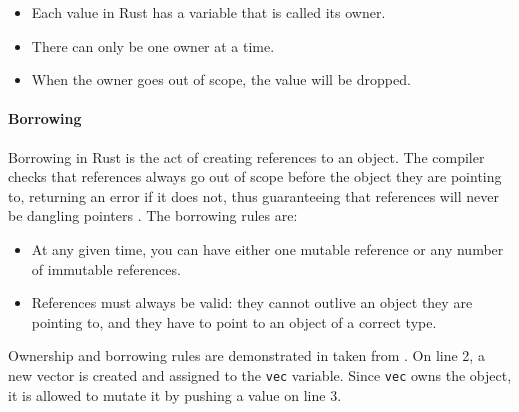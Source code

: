 \begin{itemize}
    \item Each value in Rust has a variable that is called its owner.
    \item There can only be one owner at a time.
    \item When the owner goes out of scope, the value will be dropped.
\end{itemize}

\paragraph{Borrowing}
Borrowing in Rust is the act of creating references to an object. The compiler checks that references always go out of scope before the object they are pointing to, returning an error if it does not, thus guaranteeing that references will never be dangling pointers \cite{reed-patina}. The borrowing rules are:

\begin{itemize}
    \item At any given time, you can have either one mutable reference or any number of immutable references.
    \item References must always be valid: they cannot outlive an object they are pointing to, and they have to point to an object of a correct type.
\end{itemize}

Ownership and borrowing rules are demonstrated in  taken from \cite{linus-parallelization}. On line 2, a new vector is created and assigned to the \texttt{vec} variable. Since \texttt{vec} owns the object, it is allowed to mutate it by pushing a value on line 3.

